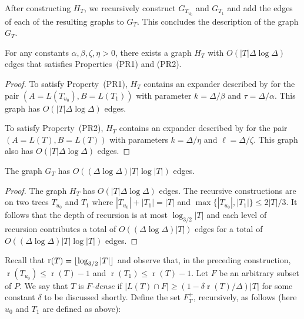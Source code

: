 \documentclass{patmorin}
\DeclareMathOperator{\rank}{r}
\begin{document}
After constructing $H_T$, we recursively construct $G_{T_{u_0}}$
and $G_{T_1}$ and add the edges of each of the resulting graphs to
$G_{T}$. This concludes the description of the graph $G_T$.

\begin{clm}
  For any constants $\alpha,\beta,\zeta,\eta>0$, there exists a graph $H_T$ with
  $O(|T|\Delta\log\Delta)$ edges that satisfies Properties~(PR1) and (PR2).
\end{clm}

\begin{proof}
  To satisfy Property~(PR1), $H_T$ contains an expander described
  by  for the pair $(A=L(T_{u_0}),B=L(T_1))$ with
  parameter $k=\Delta/\beta$ and $\tau=\Delta/\alpha$.  This graph has
  $O(|T|\Delta\log\Delta)$ edges.

  To satisfy Property~(PR2), $H_T$ contains an expander described by
   for the pair $(A=L(T),B=L(T))$ with
  parameters $k=\Delta/\eta$ and $\ell=\Delta/\zeta$. This graph also
  has $O(|T|\Delta\log\Delta)$ edges.
\end{proof}


\begin{clm}
  The graph $G_{T}$ has $O((\Delta\log\Delta)|T|\log |T|)$ edges.
\end{clm}

\begin{proof}
  The graph $H_T$ has
  $O(|T|\Delta\log\Delta)$ edges.  The recursive constructions are on two trees $T_{u_0}$
  and $T_1$ where $|T_{u_0}|+|T_1|=|T|$ and $\max\{|T_{u_0}|,|T_1|\}\le
  2|T|/3$. It follows that the depth of recursion is at most
  $\log_{3/2}|T|$ and each level of recursion contributes a total of
  $O((\Delta\log\Delta)|T|)$ edges for a total of $O((\Delta\log\Delta)|T|\log|T|)$ edges.
\end{proof}

Recall that $\rank(T)=\floor{\log_{3/2} |T|}$ and observe that, in
the preceding construction, $\rank(T_{u_0}) \le \rank(T)-1$ and
$\rank(T_1)\le\rank(T)-1$.  Let $F$ be an arbitrary subset of $P$.  We say
that $T$ is \emph{$F$-dense} if $|L(T)\cap F|\ge (1-\delta\rank(T)/\Delta)|T|$
for some constant $\delta$ to be discussed shortly.  Define the set
$F^+_T$, recursively, as follows (here $u_0$ and $T_1$ are defined as above):
\end{document}
